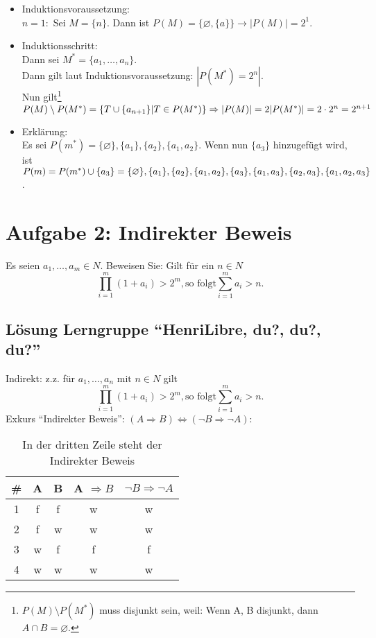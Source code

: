\documentclass[12pt,a4paper]{report}
\begin{document}
\begin{enumerate}
		\begin{itemize}
			\item Induktionsvoraussetzung:\\
			$ n=1: $ Sei $M=\{n\}$. Dann ist $P(M)=\{\varnothing,\{a\}\} \rightarrow |P(M)|=2^1$.
			\item Induktionsschritt:\\
			Dann sei $M^*=\{a_1,\dots, a_n\}$.\\
			Dann gilt laut Induktionsvoraussetzung: $|P(M^*)=2^n|$.
			\\Nun gilt\footnote{$P(M) \setminus P(M^*)$ muss disjunkt sein, weil: Wenn A, B disjunkt, dann $ A \cap B = \varnothing$.} $P(M) \setminus P(M^*) = \{T \cup \{a_{n+1}\} | T \in P(M^*)\} \\
			\Rightarrow |P(M)|=2|P(M^*)|=2\cdot 2^n= 2^{n+1}$
			\item Erklärung:\\
			Es sei $ P(m^*) = \{\varnothing\}, \{a_1\}, \{a_2\}, \{a_1,a_2\}$. Wenn nun $ \{a_3\} $ hinzugefügt wird, ist $ P(m) = P(m^*) \cup \{a_{3}\} = \{\varnothing\}, \{a_1\}, \{a_2\}, \{a_1,a_2\},\\
			\{a_3\}, \{a_1,a_3\}, \{a_2,a_3\}, \{a_1,a_2,a_3\} $.
		\end{itemize}
	\end{enumerate}

\section{Aufgabe 2: Indirekter Beweis}

Es seien $ a_1,\dots, a_m \in N $. Beweisen Sie: Gilt für ein $n \in N $
\begin{equation}
\prod^{m}_{i=1}(1+a_i) > 2^m,\text{so folgt} \sum^{m}_{i=1}a_i > n.
\end{equation}

	\subsection{Lösung Lerngruppe \enquote{HenriLibre, du?, du?, du?}}
	Indirekt: z.z. für $ a_1, \ldots, a_n \text{ mit } n \in N$ gilt\\
	\begin{equation}
	\prod^{m}_{i=1}(1+a_i) > 2^m,\text{so folgt} \sum^{m}_{i=1}a_i > n.
	\end{equation}
	Exkurs \enquote{Indirekter Beweis}: $(A \Rightarrow B) \Leftrightarrow (\neg B \Rightarrow \neg A)$:
	
	\begin{table}[H]
		\center
		\begin{tabular}{c | c | c | c | c }
		 \# & A & B & A $\Rightarrow B $ & $ \neg B \Rightarrow \neg A $ \\
		 \hline
		 1 & f & f & w & w \\
		 2 & f & w & w & w \\
		 3 & w & f & f & f \\
		 4 & w & w & w & w \\
		\end{tabular}
		\caption{ In der dritten Zeile steht der Indirekter Beweis}
		\end{table}
		
\end{document}
